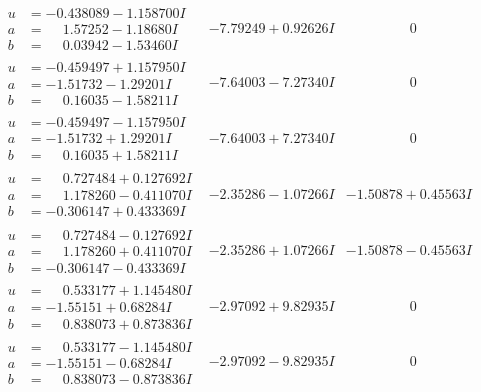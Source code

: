 \documentclass[1p]{elsarticle_modified}
\theoremstyle{definition}
\begin{document}
$$\begin{array}{c|c|c}
\begin{aligned}
u &= -0.438089 - 1.158700 I \\
a &= \phantom{-}1.57252 - 1.18680 I \\
b &= \phantom{-}0.03942 - 1.53460 I\end{aligned}
 & -7.79249 + 0.92626 I & \phantom{-0.000000 } 0 \\ \hline\begin{aligned}
u &= -0.459497 + 1.157950 I \\
a &= -1.51732 - 1.29201 I \\
b &= \phantom{-}0.16035 - 1.58211 I\end{aligned}
 & -7.64003 - 7.27340 I & \phantom{-0.000000 } 0 \\ \hline\begin{aligned}
u &= -0.459497 - 1.157950 I \\
a &= -1.51732 + 1.29201 I \\
b &= \phantom{-}0.16035 + 1.58211 I\end{aligned}
 & -7.64003 + 7.27340 I & \phantom{-0.000000 } 0 \\ \hline\begin{aligned}
u &= \phantom{-}0.727484 + 0.127692 I \\
a &= \phantom{-}1.178260 - 0.411070 I \\
b &= -0.306147 + 0.433369 I\end{aligned}
 & -2.35286 - 1.07266 I & -1.50878 + 0.45563 I \\ \hline\begin{aligned}
u &= \phantom{-}0.727484 - 0.127692 I \\
a &= \phantom{-}1.178260 + 0.411070 I \\
b &= -0.306147 - 0.433369 I\end{aligned}
 & -2.35286 + 1.07266 I & -1.50878 - 0.45563 I \\ \hline\begin{aligned}
u &= \phantom{-}0.533177 + 1.145480 I \\
a &= -1.55151 + 0.68284 I \\
b &= \phantom{-}0.838073 + 0.873836 I\end{aligned}
 & -2.97092 + 9.82935 I & \phantom{-0.000000 } 0 \\ \hline\begin{aligned}
u &= \phantom{-}0.533177 - 1.145480 I \\
a &= -1.55151 - 0.68284 I \\
b &= \phantom{-}0.838073 - 0.873836 I\end{aligned}
 & -2.97092 - 9.82935 I & \phantom{-0.000000 } 0 \\ \hline\begin{aligned}

\end{aligned}
\end{array}$$
\end{document}
